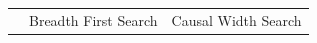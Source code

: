\documentclass[letterpaper]{article} %
\begin{document}
\begin{table}[t]

\begin{tabular}{|c c | r r r | r r r r r |} 
\hline
\multicolumn{2}{|c|}{} & \multicolumn{3}{c|}{Breadth First Search} & \multicolumn{5}{c|}{Causal Width Search} \\
 

\end{tabular}
\end{table}
\end{document}
